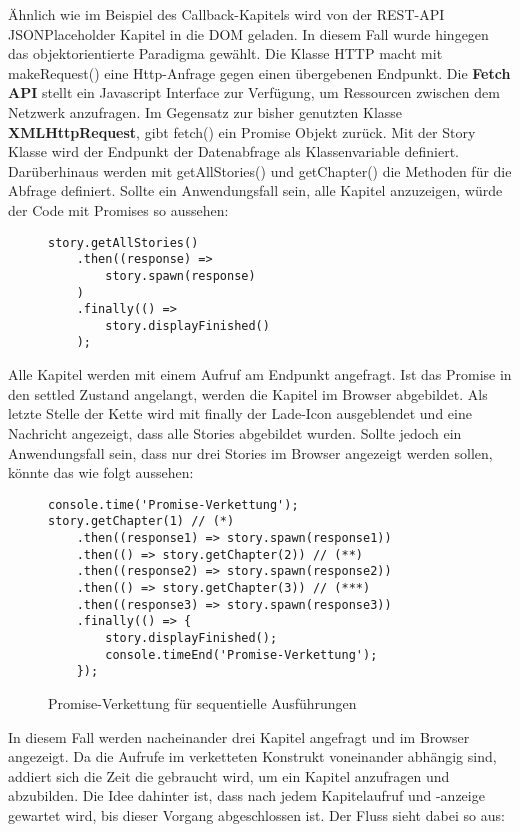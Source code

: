 \noindent
Ähnlich wie im Beispiel des Callback-Kapitels wird von der REST-API JSONPlaceholder Kapitel in die DOM geladen. In diesem Fall wurde hingegen das objektorientierte Paradigma gewählt. Die Klasse HTTP macht mit makeRequest() eine Http-Anfrage gegen einen übergebenen Endpunkt. Die \textbf{Fetch API} stellt ein Javascript Interface zur Verfügung, um Ressourcen zwischen dem Netzwerk anzufragen. Im Gegensatz zur bisher genutzten Klasse \textbf{XMLHttpRequest}, gibt fetch() ein Promise Objekt zurück. Mit der Story Klasse wird der Endpunkt der Datenabfrage als Klassenvariable definiert. Darüberhinaus werden mit getAllStories() und getChapter() die Methoden für die Abfrage definiert. Sollte ein Anwendungsfall sein, alle Kapitel anzuzeigen, würde der Code mit Promises so aussehen:

\begin{figure}[H]
\begin{lstlisting}[basicstyle=\small]
story.getAllStories()
    .then((response) =>
        story.spawn(response)
    )
    .finally(() =>
        story.displayFinished()
    );
\end{lstlisting}
\end{figure}

\noindent
Alle Kapitel werden mit einem Aufruf am Endpunkt angefragt. Ist das Promise in den settled Zustand angelangt, werden die Kapitel im Browser abgebildet. Als letzte Stelle der Kette wird mit finally der Lade-Icon ausgeblendet und eine Nachricht angezeigt, dass alle Stories abgebildet wurden. Sollte jedoch ein Anwendungsfall sein, dass nur drei Stories im Browser angezeigt werden sollen, könnte das wie folgt aussehen: 

\begin{figure}[H]
\begin{lstlisting}[basicstyle=\small]
console.time('Promise-Verkettung');
story.getChapter(1) // (*)
    .then((response1) => story.spawn(response1))
    .then(() => story.getChapter(2)) // (**)
    .then((response2) => story.spawn(response2))
    .then(() => story.getChapter(3)) // (***)
    .then((response3) => story.spawn(response3))
    .finally(() => {
        story.displayFinished();
        console.timeEnd('Promise-Verkettung');
    });
\end{lstlisting}
\caption{Promise-Verkettung für sequentielle Ausführungen}
\label{Promises-sequential-calls}
\end{figure}

\noindent
In diesem Fall werden nacheinander drei Kapitel angefragt und im Browser angezeigt. Da die Aufrufe im verketteten Konstrukt voneinander abhängig sind, addiert sich die Zeit die gebraucht wird, um ein Kapitel anzufragen und abzubilden. Die Idee dahinter ist, dass nach jedem Kapitelaufruf und -anzeige gewartet wird, bis dieser Vorgang abgeschlossen ist. Der Fluss sieht dabei so aus:

